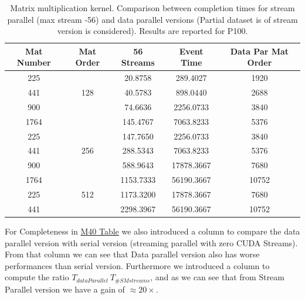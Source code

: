 \begin{itemize}
\begin{table}[!h]
\begin{tabular}{ | c  c || c | c  || c || }
		
			Mat Number&	Mat Order&	56 Streams&	Event Time&	Data Par Mat Order\\
			\hline	\hline	
			225&	\multirow{3}{*}{128}&	20.8758	& 289.4027&	1920\\
			441	& &	40.5783&	898.0440&	2688\\
			900	& &	74.6636&	2256.0733&	3840\\
			1764& &	145.4767&	7063.8233&	5376\\
			\hline
			225&	\multirow{3}{*}{256}&	147.7650&	2256.0733&	3840\\
			441	& &	288.5343&	7063.8233&	5376\\
			900	& &	588.9643&	17878.3667&	7680\\
			1764& &	1153.7333&	56190.3667&	10752\\
			\hline
			225&	\multirow{1}{*}{512}&	1173.3200&	17878.3667&	7680\\
			441	& &	2298.3967&	56190.3667&	10752\\
			\hline
		\end{tabular}
		\caption{Matrix multiplication kernel. Comparison between completion times for stream parallel (max stream -56) and data parallel versions (Partial dataset is of stream version is considered). Results are reported for P100.}	
		\label{tab:matdataparVSsmP100}		
	\end{table}
	
	For Completeness in \hyperref[tab:matdataparVSsmM40]{M40 Table} we also introduced a column to compare the data parallel version with serial version (streaming parallel with zero CUDA Streams).\\
	From that column we can see that Data parallel version also has worse performances than serial version. Furthermore we introduced a column to compute the ratio \(T_{dataParallel} \ T_{\#SM streams}\), and as we can see that from Stream Parallel version we have a gain of \(\approx 20\times\).
	
	\begin{table}[!h]
		\centering
		\begin{tabular}{ | c  c || c | c  || c | c | c  || } 
			\hline
		

\end{tabular}
\end{table}
\end{itemize}
